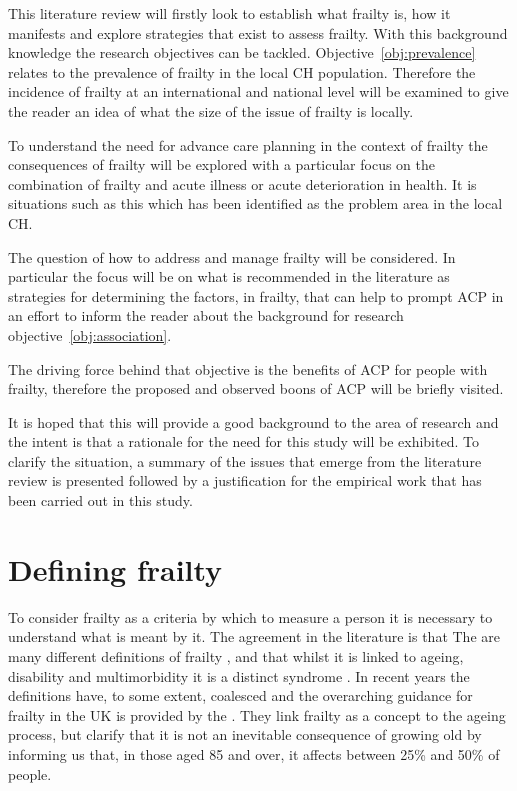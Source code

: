 \documentclass
[
	12pt,
	a4paper,
	oneside,
]{report}
\begin{document}
This literature review will firstly look to establish what frailty is, how it
manifests and explore strategies that exist to assess frailty. With this 
background knowledge the research objectives can be tackled. 
Objective~\ref{obj:prevalence} relates to the prevalence of frailty in the
local CH population. Therefore the incidence of frailty at an international
and national level will be examined to give the reader an idea of what the
size of the issue of frailty is locally.

To understand the need for advance care planning in the context of frailty
the consequences of frailty will be explored with a particular focus on the
combination of frailty and acute illness or acute deterioration in health. 
It is situations such as this which has been identified as the problem area
in the local CH.

The question of how to address and manage frailty will be considered. In 
particular the focus will be on what is recommended in the literature as 
strategies for determining the factors, in frailty, that can help to prompt
ACP in an effort to inform the reader about the background for research 
objective~\ref{obj:association}.

The driving force behind that objective is the benefits of ACP for people with 
frailty, therefore the proposed and observed boons of ACP will be briefly 
visited.

It is hoped that this will provide a good background to the area of research
and the intent is that a rationale for the need for this study will be 
exhibited. To clarify the situation, a summary of the issues that emerge from
the literature review is presented followed by a justification for the
empirical work that has been carried out in this study.

\section{Defining frailty}

To consider frailty as a criteria by which to measure a person it is necessary
to understand what is meant by it. The agreement in the literature is that The
are many different definitions of frailty
\parencite{ensrud:08,rockwood:05,conroy:09}, and that whilst it is linked to
ageing, disability and multimorbidity it is a distinct syndrome
\parencite{fried:01,conroy:09}. In recent years the definitions have, to some
extent, coalesced and the overarching guidance for frailty in the 
UK is provided by the \textcite{bgs:14}. They link frailty as a concept to the 
ageing process, but clarify that it is not an inevitable consequence of growing
old by informing us that, in those aged 85 and over, it affects between 25\% 
and 50\% of people. 
\end{document}

